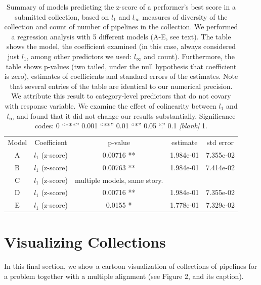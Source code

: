 \documentclass{article}
\begin{document}
\begin{table}
  \begin{tabular}{c|c|c|c|c}
    Model & Coefficient & p-value & estimate & std error \\
    A  & $l_1$ (z-score) & 0.00716 ** & 1.984e-01 & 7.355e-02 \\
    B  & $l_1$ (z-score) & 0.00763 ** & 1.984e-01 & 7.414e-02 \\
    C  & $l_1$ (z-score) & multiple models, same story. & & \\
    D  & $l_1$ (z-score) & 0.00716 ** & 1.984e-01 & 7.355e-02 \\
    E  & $l_1$ (z-score) & 0.0155  *  & 1.778e-01 & 7.329e-02 \\
  \end{tabular}
  \caption{Summary of models predicting the z-score of a performer's
    best score in a submitted collection, based on $l_1$ and
    $l_\infty$ measures of diversity of the collection and count of
    number of pipelines in the collection.  We performed a regression
    analysis with 5 different models (A-E, see text).  The table
    shows the model, the coefficient examined (in this case, always
    considered just $l_1$, among other predictors we used: $l_\infty$
    and count).  Furthermore, the table shows p-values (two tailed,
    under the null hypothesis that coefficient is zero), estimates of
    coefficients and standard errors of the estimates.  Note that
    several entries of the table are identical to our numerical
    precision.  We attribute this result to category-level predictors
    that do not covary with response variable.  We examine the effect
    of colinearity between $l_1$ and $l_\infty$ and found that it did
    not change our results substantially. Significance codes: 0
    ``***'' 0.001 ``**'' 0.01 ``*'' 0.05 ``.''  0.1 \emph{[blank]} 1.}
\end{table}

\section{Visualizing Collections}
\label{sec:visualization}
In this final section, we show a cartoon visualization of collections
of pipelines for a problem together with a multiple alignment (see
Figure 2, and its caption).
\end{document}
